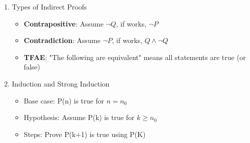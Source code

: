 \documentclass[]{article}
\begin{document}
\begin{multicols}{2}
\begin{enumerate}
  \item Types of Indirect Proofs
    \begin{itemize}
        \item \textbf{Contrapositive}: Assume $\neg Q$, if works, $\neg P$
        \item \textbf{Contradiction}: Assume $\neg P$, if works, $Q \land \neg Q$
        \item \textbf{TFAE}: "The following are equivalent" means all statements are true (or false)
    \end{itemize}
  \item Induction and Strong Induction
    \begin{itemize}
      \item Base case: P(n) is true for $n = n_0$ 
      \item Hypothesis: Assume P(k) is true for $k \geq n_0$
      \item Steps: Prove P(k+1) is true using P(K)
    \end{itemize}
  
\end{enumerate}

\end{multicols}
\end{document}
